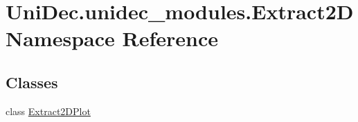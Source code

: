 \hypertarget{namespace_uni_dec_1_1unidec__modules_1_1_extract2_d}{}\section{Uni\+Dec.\+unidec\+\_\+modules.\+Extract2\+D Namespace Reference}
\label{namespace_uni_dec_1_1unidec__modules_1_1_extract2_d}
\subsection*{Classes}
\begin{DoxyCompactItemize}
\item 
class \hyperlink{class_uni_dec_1_1unidec__modules_1_1_extract2_d_1_1_extract2_d_plot}{Extract2\+D\+Plot}
\end{DoxyCompactItemize}
